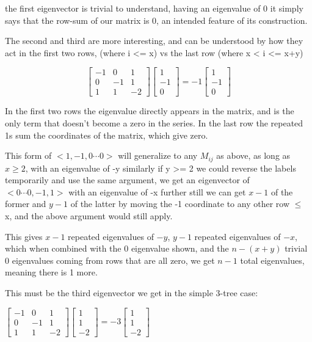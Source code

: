 \documentclass{report}
\begin{document}
the first eigenvector is trivial to understand, having an eigenvalue of 0 it
simply says that the row-sum of our matrix is 0, an intended feature of its
construction.

The second and third are more interesting, and can be understood by how they
act in the first two rows, (where i <= x) vs the last row (where x < i <= x+y)

\begin{equation*}
\left[\begin{matrix}
	-1 & 0 & 1\\
	0 & -1 & 1\\
	1 & 1 & -2
\end{matrix}\right]
\left[\begin{matrix}
	1\\
	-1\\
	0
\end{matrix}\right]
=
-1
\left[\begin{matrix}
	1\\
	-1\\
	0
\end{matrix}\right]
\end{equation*}

In the first two rows the eigenvalue directly appears in the matrix, and is the
only term that doesn't become a zero in the series.
In the last row the repeated 1s sum the coordinates of the matrix, which give
zero.

This form of $<1, -1, 0\cdots 0>$ will generalize to any $M_{ij}$ as above, as long as
$x \geq 2$, with an eigenvalue of -y
similarly if y >= 2 we could reverse the labels temporarily and use the same
argument, we get an eigenvector of $<0\cdots 0, -1, 1>$ with an eigenvalue of -x
further still we can get $x-1$ of the former and $y-1$ of the latter by moving the
-1 coordinate to any other row $\leq$ x, and the above argument would still apply.

This gives $x-1$ repeated eigenvalues of $-y$, $y-1$ repeated eigenvalues of $-x$,
which when combined with the 0 eigenvalue shown, and the $n - (x + y)$ trivial $0$
eigenvalues coming from rows that are all zero, we get $n-1$ total eigenvalues,
meaning there is 1 more.

This must be the third eigenvector we get in the simple 3-tree case:

$
\left[\begin{matrix}
	-1 & 0 & 1\\
	0 & -1 & 1\\
	1 & 1 & -2
\end{matrix}\right]
\left[\begin{matrix}
	1\\
	1\\
	-2
\end{matrix}\right]
=
-3
\left[\begin{matrix}
	1\\
	1\\
	-2
\end{matrix}\right]
$
\end{document}
